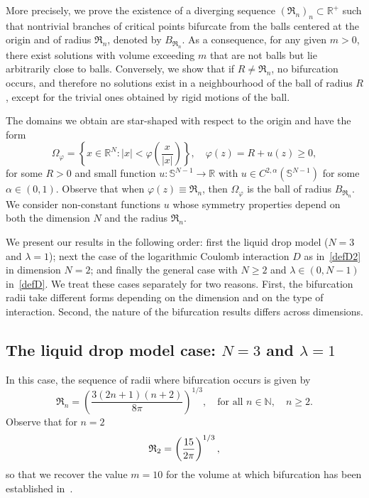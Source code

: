 \documentclass[10pt,reqno,english]{amsart}
\newcommand{\rn}{{\mathfrak R}_n  }
\newcommand{\N}{\mathbb{N}}
\theoremstyle{definition}
\numberwithin{equation}{section}
\begin{document}
More precisely, we prove the existence of a diverging sequence $(\rn)_n \subset \mathbb{R}^+$  such that nontrivial branches of critical points bifurcate from the balls centered at the origin and of radius $\rn$, denoted by  $B_{\rn}$.  As a consequence, for any given $m>0$, there exist solutions with volume exceeding $m$ that are not balls but lie arbitrarily close to balls. Conversely, we show that if $R \neq \rn$, no bifurcation occurs, and therefore no solutions exist in a neighbourhood of the ball of radius $R$, except for the trivial ones obtained by rigid motions of the ball.


\medskip

The domains we obtain are star-shaped with respect to the origin and have the form
\begin{equation}\label{Omegavarphi}
\Omega_\varphi  = \left\{ x \in \mathbb{R}^N : |x| < \varphi \!\left( \frac{x}{|x|} \right) \right\}, \quad \varphi (z) = R + u \!\left( z \right)\ge0,
\end{equation}
for some $R>0$ and small function $u : \mathbb{S}^{N-1} \to \mathbb{R}$ with $u \in C^{2,\alpha}(\mathbb{S}^{N-1})$ for some $\alpha \in (0,1)$. Observe that when $\varphi (z) \equiv \rn $, then $\Omega_\varphi$ is the ball of radius $B_{\rn}$. We consider non-constant functions $u$ whose symmetry properties depend on both the dimension $N$ and the radius $\rn$. 


\medskip

We present our results in the following order: first the liquid drop model ($N=3$ and $\lambda = 1$); next the case of the logarithmic Coulomb interaction $D$ as in~\eqref{defD2} in dimension $N=2$; and finally the general case with $N \ge 2$ and $\lambda \in (0, N-1)$ in~\eqref{defD}.
We treat these cases separately for two reasons. First, the bifurcation radii take different forms depending on the dimension and on the type of interaction. Second, the nature of the bifurcation results differs across dimensions.


\medskip

\subsection{The liquid drop model case: \texorpdfstring{$N=3$}{N=3} and \texorpdfstring{$\lambda =1$}{lambda=1}}


In this case, the sequence of radii where bifurcation occurs is given by
\begin{equation}\label{Rn3}
\rn=\left(\frac{3(2n+1)(n+2)}{8\pi}\right)^{1/3}, \quad \text{for all }  n \in \N, \quad n \geq 2.
\end{equation}
Observe that for $n=2$
\[
{\mathfrak R}_2= \left({15 \over 2 \pi}\right)^{1/ 3}, 
\]
so that we recover the value  $m=10$ for the volume at which  bifurcation has been established in~\cite{Fr19}.
\end{document}
